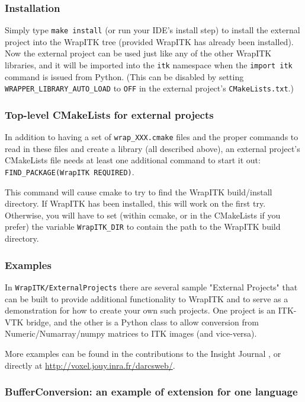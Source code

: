 \documentclass{InsightArticle}
\begin{document}
    \subsubsection{Installation}
Simply type \verb$make install$ (or run your IDE's install step) to install the
external project into the WrapITK tree (provided WrapITK has already been
installed). Now the external project can be used just like any of the other
WrapITK libraries, and it will be imported into the \verb$itk$ namespace when the
\verb$import itk$ command is issued from Python. (This can be disabled by setting
\verb$WRAPPER_LIBRARY_AUTO_LOAD$ to \verb$OFF$ in the external project's \verb$CMakeLists.txt$.)

    \subsubsection{Top-level CMakeLists for external projects}
In addition to having a set of \verb$wrap_XXX.cmake$ files and the proper
commands to read in these files and create a library (all described above), an
external project's CMakeLists file needs at least one additional command to
start it out: \verb$FIND_PACKAGE(WrapITK REQUIRED)$.

This command will cause cmake to try to find the WrapITK build/install
directory. If WrapITK has been installed, this will work on the first try.
Otherwise, you will have to set (within ccmake, or in the CMakeLists if you
prefer) the variable \verb$WrapITK_DIR$ to contain the path to the WrapITK build
directory.

    \subsubsection{Examples}

In \verb$WrapITK/ExternalProjects$ there are several sample "External Projects" that
can be built to provide additional functionality to WrapITK and to serve as a
demonstration for how to create your own such projects. One project is an
ITK-VTK \cite{VtkWebSite} bridge, and the other is a Python class to allow conversion from
Numeric/Numarray/numpy \cite{NumericWebSite,NumarrayWebSite,NumpyWebSite} matrices to
ITK images (and vice-versa).

More examples can be found in the contributions to the Insight Journal
\cite{InsightJournalWebSite}, or directly at \url{http://voxel.jouy.inra.fr/darcsweb/}.

    \subsubsection{BufferConversion: an example of extension for one language}
\end{document}
